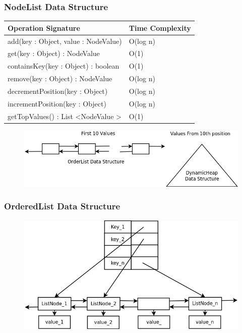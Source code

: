 \documentclass[]{beamer}
\begin{document}
\begin{frame}
\frametitle{NodeList Data Structure}

\begin{table}
\centering
\begin{tabular}{|l|l|} \hline
Operation Signature & Time Complexity \\ \hline \hline
add(key : Object, value : NodeValue) & O(log n) \\ \hline
get(key : Object) : NodeValue & O(1) \\ \hline
containsKey(key : Object) : boolean & O(1) \\ \hline
remove(key : Object) : NodeValue & O(log n) \\ \hline
decrementPosition(key : Object) & O(log n) \\ \hline
incrementPosition(key : Object) & O(log n) \\ \hline
getTopValues() : List \textless NodeValue \textgreater & O(1) \\ \hline
\end{tabular}
\end{table}

\begin{figure}
        \includegraphics[width=0.8\linewidth]{nodeliststruct.png}
\end{figure}

\end{frame}

\begin{frame}
\frametitle{OrderedList Data Structure}

\begin{figure}
        \includegraphics[width=0.8\linewidth]{orderedlist.png}
\end{figure}

\end{frame}
\end{document}
